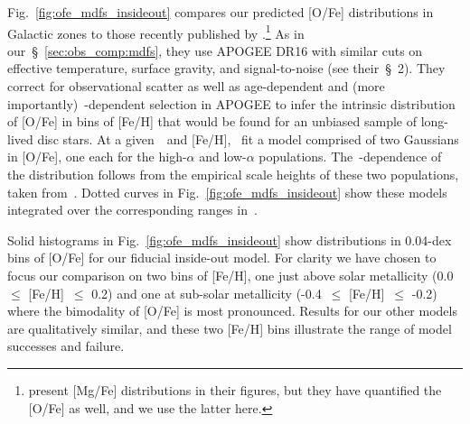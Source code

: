 \documentclass[draft2.tex]{subfiles}
\begin{document}
Fig.~\ref{fig:ofe_mdfs_insideout} compares our predicted [O/Fe] distributions 
in Galactic zones to those recently published by 
\citet{Vincenzo2021a}.\footnote{
	\citet{Vincenzo2021a} present [Mg/Fe] distributions in their figures, but 
	they have quantified the [O/Fe] as well, and we use the latter here. 
}
As in our~\S~\ref{sec:obs_comp:mdfs}, they use APOGEE DR16 with similar cuts on 
effective temperature, surface gravity, and signal-to-noise (see their~\S~2). 
They correct for observational scatter as well as age-dependent and (more 
importantly)~\absz-dependent selection in APOGEE to infer the intrinsic 
distribution of [O/Fe] in bins of [Fe/H] that would be found for an unbiased 
sample of long-lived disc stars. 
At a given~\rgal~and [Fe/H],~\citet{Vincenzo2021a} fit a model comprised of two 
Gaussians in [O/Fe], one each for the high-$\alpha$ and low-$\alpha$ 
populations.
The~\absz-dependence of the distribution follows from the empirical scale 
heights of these two populations, taken from~\citet{Bovy2016}. 
Dotted curves in Fig.~\ref{fig:ofe_mdfs_insideout} show these models integrated 
over the corresponding ranges in~\absz. 
\par 
Solid histograms in Fig.~\ref{fig:ofe_mdfs_insideout} show distributions in 
0.04-dex bins of [O/Fe] for our fiducial inside-out model. 
For clarity we have chosen to focus our comparison on two bins of [Fe/H], one 
just above solar metallicity (0.0~$\leq$ [Fe/H]~$\leq$ 0.2) and one at 
sub-solar metallicity (-0.4~$\leq$ [Fe/H]~$\leq$ -0.2) where the bimodality of 
[O/Fe] is most pronounced. Results for our other models are qualitatively 
similar, and these two [Fe/H] bins illustrate the range of model successes and 
failure. 
\end{document}
